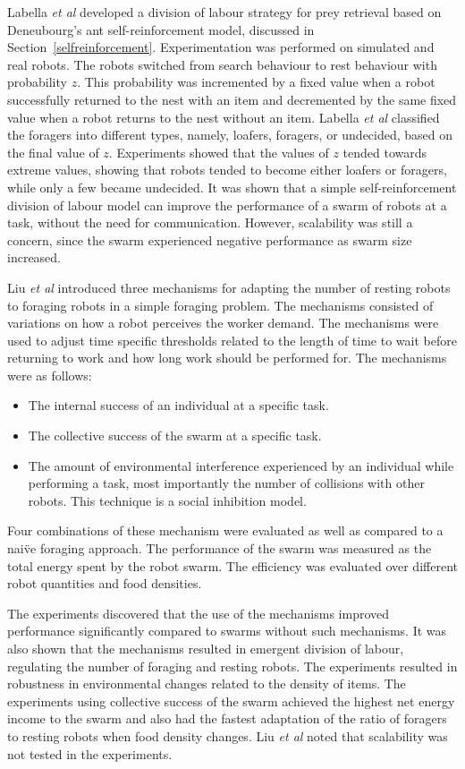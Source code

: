 Labella \textit{et al} \cite{labella2006division} developed a division of labour strategy for prey retrieval based on Deneubourg's ant self-reinforcement model, discussed in Section~\ref{selfreinforcement}. Experimentation was performed on simulated and real robots. The robots switched from search behaviour to rest behaviour with probability $z$. This probability was incremented by a fixed value when a robot successfully returned to the nest with an item and decremented by the same fixed value when a robot returns to the nest without an item. Labella \textit{et al} classified the foragers into different types, namely, loafers, foragers, or undecided, based on the final value of $z$. Experiments showed that the values of $z$ tended towards extreme values, showing that robots tended to become either loafers or foragers, while only a few became undecided. It was shown that a simple self-reinforcement division of labour model can improve the performance of a swarm of robots at a task, without the need for communication. However, scalability was still a concern, since the swarm experienced negative performance as swarm size increased. 

Liu \textit{et al} \cite{liu2007towards} introduced three mechanisms for adapting the number of resting robots to foraging robots in a simple foraging problem. The mechanisms consisted of variations on how a robot perceives the worker demand. The mechanisms were used to adjust time specific thresholds related to the length of time to wait before returning to work and how long work should be performed for. The mechanisms were as follows:

\begin{itemize}
	\item The internal success of an individual at a specific task.
	\item The collective success of the swarm at a specific task. 
	\item The amount of environmental interference experienced by an individual while performing a task, most importantly the number of collisions with other robots. This technique is a social inhibition model.
\end{itemize}

Four combinations of these mechanism were evaluated as well as compared to a nai\"ve foraging approach. The performance of the swarm was measured as the total energy spent by the robot swarm. The efficiency was evaluated over different robot quantities and food densities.

The experiments discovered that the use of the mechanisms improved performance significantly compared to swarms without such mechanisms. It was also shown that the mechanisms resulted in emergent division of labour, regulating the number of foraging and resting robots. The experiments resulted in robustness in environmental changes related to the density of items. The experiments using collective success of the swarm achieved the highest net energy income to the swarm and also had the fastest adaptation of the ratio of foragers to resting robots when food density changes. Liu \textit{et al} \cite{liu2007towards} noted that scalability was not tested in the experiments.

